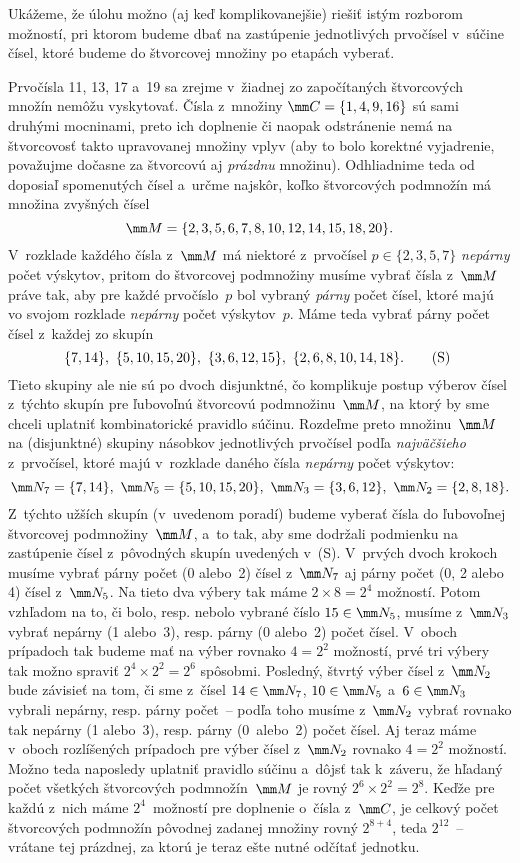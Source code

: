 {\ineres
Ukážeme, že úlohu možno (aj keď komplikovanejšie) riešiť istým rozborom
možností, pri ktorom budeme dbať na zastúpenie jednotlivých
prvočísel v~súčine čísel, ktoré budeme do štvorcovej množiny po
etapách vyberať.

Prvočísla 11, 13, 17 a~19 sa zrejme v~žiadnej zo započítaných štvorcových množín
nemôžu vyskytovať. Čísla z~množiny $\mm C=\{1,4,9,16\}$ sú
sami druhými mocninami, preto ich doplnenie či naopak odstránenie
nemá na štvorcovosť takto upravovanej množiny vplyv
(aby to bolo korektné vyjadrenie, považujme dočasne za štvorcovú
aj {\it prázdnu\/} množinu). Odhliadnime teda od doposiaľ spomenutých
čísel a~určme najskôr, koľko štvorcových podmnožín
má množina zvyšných čísel
$$
\mm M=\{2,3,5,6,7,8,10,12,14,15,18,20\}.
$$
V~rozklade každého čísla z~$\mm M$ má niektoré z~prvočísel
$p\in\{2,3,5,7\}$ {\it nepárny\/} počet výskytov, pritom do štvorcovej podmnožiny
musíme vybrať čísla z~$\mm M$ práve tak, aby pre každé prvočíslo~$p$ bol vybraný
{\it párny\/} počet čísel, ktoré majú vo svojom rozklade {\it nepárny\/}
počet výskytov~$p$. Máme teda vybrať párny počet čísel z~každej zo skupín
$$
\{7,14\},\ \{5,10,15,20\},\ \{3,6,12,15\},\ \{2,6,8,10,14,18\}.
\tag
S~$$
Tieto skupiny ale nie sú po dvoch disjunktné, čo komplikuje postup
výberov čísel z~týchto skupín pre ľubovoľnú štvorcovú podmnožinu~$\mm M$,
na ktorý by sme chceli uplatniť
kombinatorické pravidlo súčinu. Rozdeľme preto množinu~$\mm M$ na
(disjunktné) skupiny násobkov jednotlivých prvočísel podľa {\it
najväčšieho\/} z~prvočísel, ktoré majú v~rozklade daného čísla
{\it nepárny\/} počet výskytov:
$$
\mm N_{7}=\{7,14\},\
\mm N_{5}=\{5,10,15,20\},\
\mm N_{3}=\{3,6,12\},\
\mm N_{2}=\{2,8,18\}.
$$
Z~týchto užších skupín (v~uvedenom poradí) budeme vyberať čísla do ľubovoľnej
štvorcovej podmnožiny~$\mm M$, a~to tak, aby sme dodržali podmienku
na zastúpenie čísel z~pôvodných skupín uvedených v~(S).
V~prvých dvoch krokoch musíme
vybrať párny počet (0 alebo~2) čísel z~$\mm N_{7}$ aj párny počet
(0, 2 alebo 4) čísel z~$\mm N_{5}$. Na tieto dva výbery tak máme $2\times
8=2^{4}$ možností. Potom vzhľadom na to, či bolo, resp. nebolo
vybrané číslo $15\in \mm N_5$, musíme z~$\mm N_3$ vybrať nepárny (1 alebo~3),
resp. párny (0 alebo~2) počet čísel. V~oboch prípadoch tak
budeme mať na výber rovnako $4=2^2$ možností, prvé tri výbery
tak možno spraviť $2^{4}\times2^{2}=2^{6}$ spôsobmi. Posledný,
štvrtý výber čísel z~$\mm N_{2}$ bude závisieť na tom,
či sme z~čísel $14\in \mm N_7$, $10\in \mm N_5$ a~$6\in \mm N_3$
vybrali nepárny, resp. párny počet~-- podľa toho musíme z~$\mm N_{2}$
vybrať rovnako tak nepárny (1 alebo~3), resp. párny (0~alebo~2) počet čísel.
Aj teraz máme v~oboch rozlíšených prípadoch pre výber čísel z~$\mm N_2$
rovnako $4=2^2$ možností. Možno teda naposledy uplatniť
pravidlo súčinu a~dôjsť tak k~záveru, že hľadaný počet
všetkých štvorcových podmnožín~$\mm M$ je rovný
$2^{6}\times2^{2}=2^{8}$. Keďže pre každú z~nich máme
$2^4$~možností pre doplnenie
o~čísla z~$\mm C$, je celkový počet štvorcových
podmnožín pôvodnej zadanej množiny rovný
$2^{8+4}$, teda $2^{12}$~-- vrátane tej prázdnej, za ktorú je teraz
ešte nutné odčítať jednotku.

}

